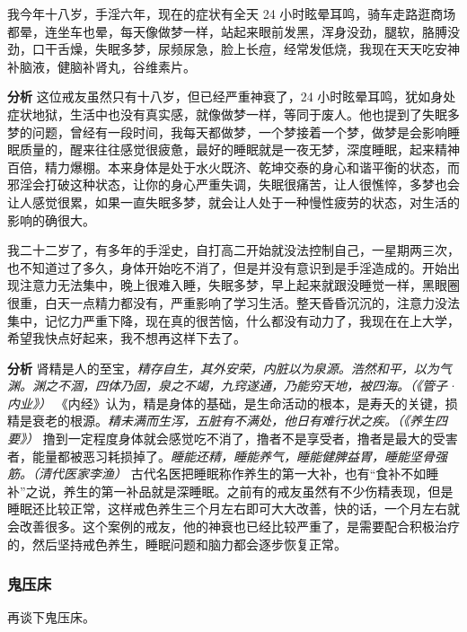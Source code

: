 \begin{case}
    我今年十八岁，手淫六年，现在的症状有全天 24 小时眩晕耳鸣，骑车走路逛商场都晕，连坐车也晕，每天像做梦一样，站起来眼前发黑，浑身没劲，腿软，胳膊没劲，口干舌燥，失眠多梦，尿频尿急，脸上长痘，经常发低烧，我现在天天吃安神补脑液，健脑补肾丸，谷维素片。

    \textbf{分析} 这位戒友虽然只有十八岁，但已经严重神衰了，24 小时眩晕耳鸣，犹如身处症状地狱，生活中也没有真实感，就像做梦一样，等同于废人。他也提到了失眠多梦的问题，曾经有一段时间，我每天都做梦，一个梦接着一个梦，做梦是会影响睡眠质量的，醒来往往感觉很疲惫，最好的睡眠就是一夜无梦，深度睡眠，起来精神百倍，精力爆棚。本来身体是处于水火既济、乾坤交泰的身心和谐平衡的状态，而邪淫会打破这种状态，让你的身心严重失调，失眠很痛苦，让人很憔悴，多梦也会让人感觉很累，如果一直失眠多梦，就会让人处于一种慢性疲劳的状态，对生活的影响的确很大。
\end{case}

\begin{case}
    我二十二岁了，有多年的手淫史，自打高二开始就没法控制自己，一星期两三次，也不知道过了多久，身体开始吃不消了，但是并没有意识到是手淫造成的。开始出现注意力无法集中，晚上很难入睡，失眠多梦，早上起来就跟没睡觉一样，黑眼圈很重，白天一点精力都没有，严重影响了学习生活。整天昏昏沉沉的，注意力没法集中，记忆力严重下降，现在真的很苦恼，什么都没有动力了，我现在在上大学，希望我快点好起来，我不想再这样下去了。

    \textbf{分析} 肾精是人的至宝，\textit{精存自生，其外安荣，内脏以为泉源。浩然和平，以为气渊。渊之不涸，四体乃固，泉之不竭，九窍遂通，乃能穷天地，被四海。（《管子·内业》）} 《内经》认为，精是身体的基础，是生命活动的根本，是寿夭的关键，损精是衰老的根源。\textit{精未满而生泻，五脏有不满处，他日有难行状之疾。（《养生四要》）} 撸到一定程度身体就会感觉吃不消了，撸者不是享受者，撸者是最大的受害者，能量都被恶习耗损掉了。\textit{睡能还精，睡能养气，睡能健脾益胃，睡能坚骨强筋。（清代医家李渔）} 古代名医把睡眠称作养生的第一大补，也有“食补不如睡补”之说，养生的第一补品就是深睡眠。之前有的戒友虽然有不少伤精表现，但是睡眠还比较正常，这样戒色养生三个月左右即可大大改善，快的话，一个月左右就会改善很多。这个案例的戒友，他的神衰也已经比较严重了，是需要配合积极治疗的，然后坚持戒色养生，睡眠问题和脑力都会逐步恢复正常。
\end{case}

\subsubsection{鬼压床}

再谈下鬼压床。

